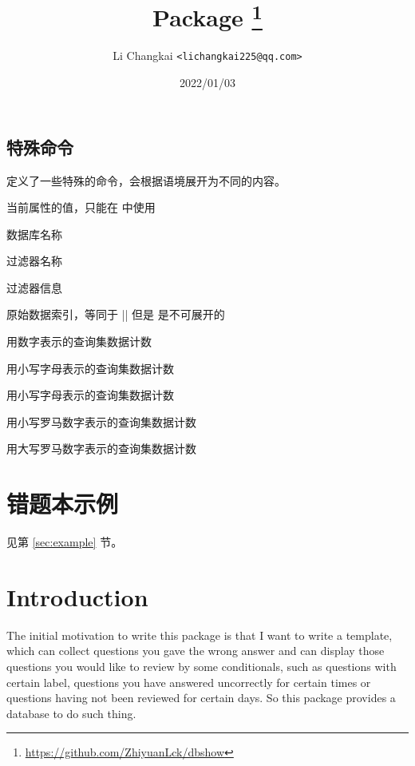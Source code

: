 \documentclass[full]{l3doc}
\begin{document}
\begin{documentation}
\subsection{特殊命令}

 定义了一些特殊的命令，会根据语境展开为不同的内容。

\DescribeMacro{\dbval}当前属性的值，只能在  中使用

\DescribeMacro{\dbDatabase}数据库名称

\DescribeMacro{\dbFilterName}过滤器名称

\DescribeMacro{\dbFilterInfo}过滤器信息

\DescribeMacro{\dbIndex}原始数据索引，等同于 || 但是  是不可展开的

\DescribeMacro{\dbarabic}用数字表示的查询集数据计数

\DescribeMacro{\dbalph}用小写字母表示的查询集数据计数

\DescribeMacro{\dbAlph}用小写字母表示的查询集数据计数

\DescribeMacro{\dbroman}用小写罗马数字表示的查询集数据计数

\DescribeMacro{\dbRoman}用大写罗马数字表示的查询集数据计数

\section{错题本示例}
见第 \ref{sec:example} 节。

\title{
  Package 
  \protect\footnote{\url{https://github.com/ZhiyuanLck/dbshow}}
}
\author{Li Changkai \texttt{<lichangkai225@qq.com>}}
\date{2022/01/03}
\maketitle

\section{Introduction}

The initial motivation to write this package is that I want to write a
template, which can collect questions you gave the wrong answer and can
display those questions you would like to review by some conditionals, such as
questions with certain label, questions you have answered uncorrectly for
certain times or questions having not been reviewed for certain days. So this
package provides a database to do such thing.


\end{documentation}
\end{document}
